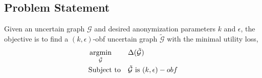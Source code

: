 \subsection{Problem Statement} 
\begin{problem}
     Given an uncertain graph $\mathcal{G}$ and desired anonymization parameters $k$ and $\epsilon$, 
     the objective is to find a  $(k,\epsilon)$-obf uncertain graph $\tilde{\mathcal{G}}$
     with the minimal utility loss,
     \vspace{-5pt}
     \begin{equation*}
             \begin{aligned}
                 & \argmin_{\tilde{
                \mathcal{G}}} & & \Delta(\tilde{\mathcal{G}}) \\
                &  \text{Subject to} & &\tilde{\mathcal{G}} \text{~is~} (k,\epsilon)-obf
            \end{aligned}
     \end{equation*}
     \label{prob:unobf}
\end{problem}
